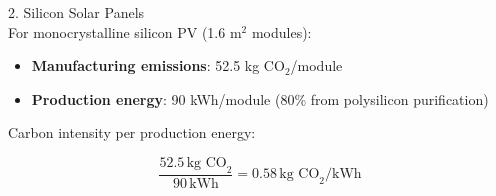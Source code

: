 \documentclass{article}
\newcommand{\wm}[2]{%
	\begin{minipage}{#1\textwidth}
		\centering
		#2
	\end{minipage}%
}
\begin{document}
\vspace*{\fill}

\begin{minipage}{0.55\textwidth}
	\Large
	{2. Silicon Solar Panels}\\[8pt]
	\normalsize
	For monocrystalline silicon PV (1.6 m$^2$ modules):\\[-4pt]
	\begin{itemize}[itemsep=2mm]
		\item \textbf{Manufacturing emissions}: 52.5 kg CO$_2$/module\footnotemark
		\item \textbf{Production energy}: 90 kWh/module (80\% from polysilicon purification)
	\end{itemize}
\end{minipage}\hfil
\begin{minipage}{0.5\textwidth}\centering
	\hspace{-1em}\wm{1}{Carbon intensity per production energy:}
	\[\frac{52.5\,\text{kg CO}_2}{90\,\text{kWh}} = {0.58\,\text{kg CO}_2/\text{kWh}}\]
\end{minipage}\\

\vspace*{\fill}



\newpage

\vspace{1em}
\end{document}
